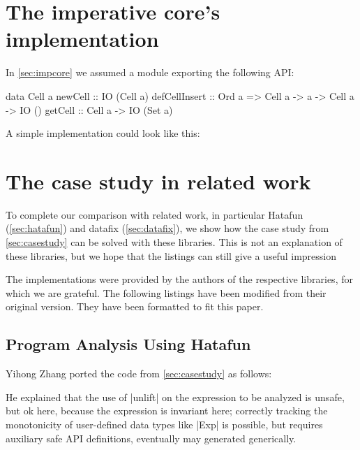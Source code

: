 \documentclass[manuscript,screen,acmsmall,nonacm]{acmart}
\begin{document}

\section{The imperative core's implementation}\label{sec:impcoreimpl}

In \cref{sec:impcore} we assumed a module exporting the following API:
\begin{code}
data Cell a
newCell        ::                                      IO (Cell a)
defCellInsert  ::  Ord a =>  Cell a -> a -> Cell a ->  IO ()
getCell        ::            Cell a ->                 IO (Set a)
\end{code}

\noindent 
A simple implementation could look like this:


\section{The case study in related work}

To complete our comparison with related work, in particular Hatafun (\cref{sec:hatafun}) and datafix (\cref{sec:datafix}), we show how the case study from \cref{sec:casestudy} can be solved with these libraries. This is not an explanation of these libraries, but we hope that the listings can still give a useful impression

The implementations were provided by the authors of the respective libraries, for which we are grateful. The following listings have been modified from their original version. They have been formatted to fit this paper.

\subsection{Program Analysis Using Hatafun}\label{sec:hatafun-proganal}

Yihong Zhang ported the code from \cref{sec:casestudy} as follows:


He explained that the use of |unlift| on the expression to be analyzed is unsafe, but ok here, because the expression is invariant here; correctly tracking the monotonicity of user-defined data types like |Exp| is possible, but requires auxiliary safe API definitions, eventually may generated generically.
\end{document}
